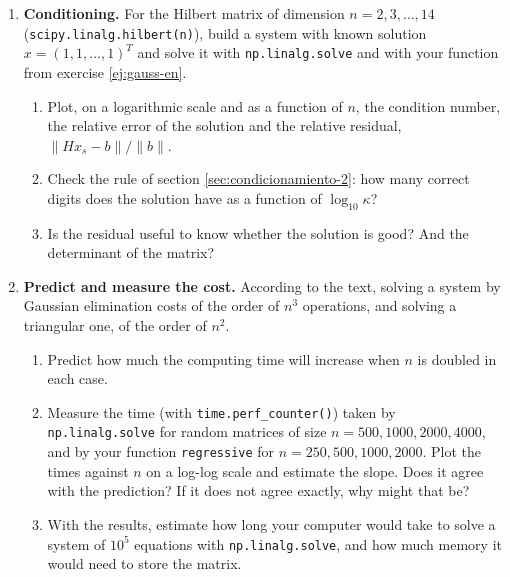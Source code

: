 \begin{enumerate}
\item \label{ej:hilbert-en} \textbf{Conditioning.} For the Hilbert matrix of dimension $n=2, 3, \dots, 14$ (\texttt{scipy.linalg.hilbert(n)}), build a system with known solution $x=(1,1,\dots,1)^T$ and solve it with \texttt{np.linalg.solve} and with your function from exercise \ref{ej:gauss-en}.
\begin{enumerate}
\item Plot, on a logarithmic scale and as a function of $n$, the condition number, the relative error of the solution and the relative residual, $\lVert H x_s-b\rVert/\lVert b\rVert$.
\item Check the rule of section \ref{sec:condicionamiento-2}: how many correct digits does the solution have as a function of $\log_{10}\kappa$?
\item Is the residual useful to know whether the solution is good? And the determinant of the matrix?
\end{enumerate}

\item \label{ej:coste-en} \textbf{Predict and measure the cost.} According to the text, solving a system by Gaussian elimination costs of the order of $n^3$ operations, and solving a triangular one, of the order of $n^2$.
\begin{enumerate}
\item Predict how much the computing time will increase when $n$ is doubled in each case.
\item Measure the time (with \texttt{time.perf\_counter()}) taken by \texttt{np.linalg.solve} for random matrices of size $n=500, 1000, 2000, 4000$, and by your function \texttt{regressive} for $n=250, 500, 1000, 2000$. Plot the times against $n$ on a log-log scale and estimate the slope. Does it agree with the prediction? If it does not agree exactly, why might that be?
\item With the results, estimate how long your computer would take to solve a system of $10^5$ equations with \texttt{np.linalg.solve}, and how much memory it would need to store the matrix.
\end{enumerate}


\end{enumerate}
